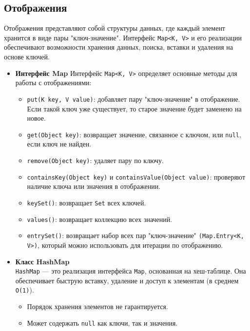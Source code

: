\subsection{Отображения}
Отображения представляют собой структуры данных, где каждый элемент хранится в виде пары "ключ-значение". Интерфейс \texttt{Map<K, V>} и его реализации обеспечивают возможности хранения данных, поиска, вставки и удаления на основе ключей.

\begin{itemize}
    \item \textbf{Интерфейс Map}
    Интерфейс \texttt{Map<K, V>} определяет основные методы для работы с отображениями:

    \begin{itemize}
        \item \texttt{put(K key, V value)}: добавляет пару "ключ-значение" в отображение. Если такой ключ уже существует, то старое значение будет заменено на новое.
    
        \item \texttt{get(Object key)}: возвращает значение, связанное с ключом, или \texttt{null}, если ключ не найден.
    
        \item \texttt{remove(Object key)}: удаляет пару по ключу.
    
        \item \texttt{containsKey(Object key)} и \texttt{containsValue(Object value)}: проверяют наличие ключа или значения в отображении.
    
        \item \texttt{keySet()}: возвращает \texttt{Set} всех ключей.
    
        \item \texttt{values()}: возвращает коллекцию всех значений.
    
        \item \texttt{entrySet()}: возвращает набор всех пар "ключ-значение" \texttt{(Map.Entry<K, V>)}, который можно использовать для итерации по отображению.
    \end{itemize}

    \item \textbf{Класс HashMap} \\ 
    \texttt{HashMap} — это реализация интерфейса \texttt{Map}, основанная на хеш-таблице. Она обеспечивает быструю вставку, удаление и доступ к элементам (в среднем \texttt{O(1)}).

    \begin{itemize}
        \item Порядок хранения элементов не гарантируется.
        \item Может содержать \texttt{null} как ключи, так и значения.
    \end{itemize}
    

\end{itemize}
